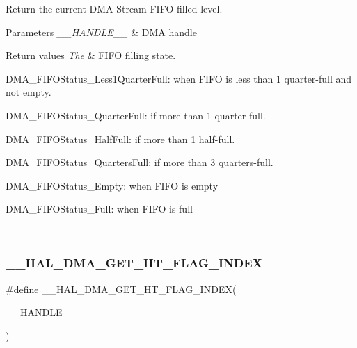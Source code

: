 Return the current D\+MA Stream F\+I\+FO filled level. 


\begin{DoxyParams}{Parameters}
{\em \+\_\+\+\_\+\+H\+A\+N\+D\+L\+E\+\_\+\+\_\+} & D\+MA handle \\
\hline
\end{DoxyParams}

\begin{DoxyRetVals}{Return values}
{\em The} & F\+I\+FO filling state.
\begin{DoxyItemize}
\item D\+M\+A\+\_\+\+F\+I\+F\+O\+Status\+\_\+\+Less1\+Quarter\+Full\+: when F\+I\+FO is less than 1 quarter-\/full and not empty.
\item D\+M\+A\+\_\+\+F\+I\+F\+O\+Status\+\_\+Quarter\+Full\+: if more than 1 quarter-\/full.
\item D\+M\+A\+\_\+\+F\+I\+F\+O\+Status\+\_\+\+Half\+Full\+: if more than 1 half-\/full.
\item D\+M\+A\+\_\+\+F\+I\+F\+O\+Status\+\_\+Quarters\+Full\+: if more than 3 quarters-\/full.
\item D\+M\+A\+\_\+\+F\+I\+F\+O\+Status\+\_\+\+Empty\+: when F\+I\+FO is empty
\item D\+M\+A\+\_\+\+F\+I\+F\+O\+Status\+\_\+\+Full\+: when F\+I\+FO is full 
\end{DoxyItemize}\\
\hline
\end{DoxyRetVals}
\mbox{\label{group___d_m_a_ga0095f5f3166a82bedc67744ac94acfba}} 
\subsubsection{\texorpdfstring{\+\_\+\+\_\+\+H\+A\+L\+\_\+\+D\+M\+A\+\_\+\+G\+E\+T\+\_\+\+H\+T\+\_\+\+F\+L\+A\+G\+\_\+\+I\+N\+D\+EX}{\_\_HAL\_DMA\_GET\_HT\_FLAG\_INDEX}}
{\footnotesize\ttfamily \#define \+\_\+\+\_\+\+H\+A\+L\+\_\+\+D\+M\+A\+\_\+\+G\+E\+T\+\_\+\+H\+T\+\_\+\+F\+L\+A\+G\+\_\+\+I\+N\+D\+EX(\begin{DoxyParamCaption}\item[{}]{\+\_\+\+\_\+\+H\+A\+N\+D\+L\+E\+\_\+\+\_\+ }\end{DoxyParamCaption})}

